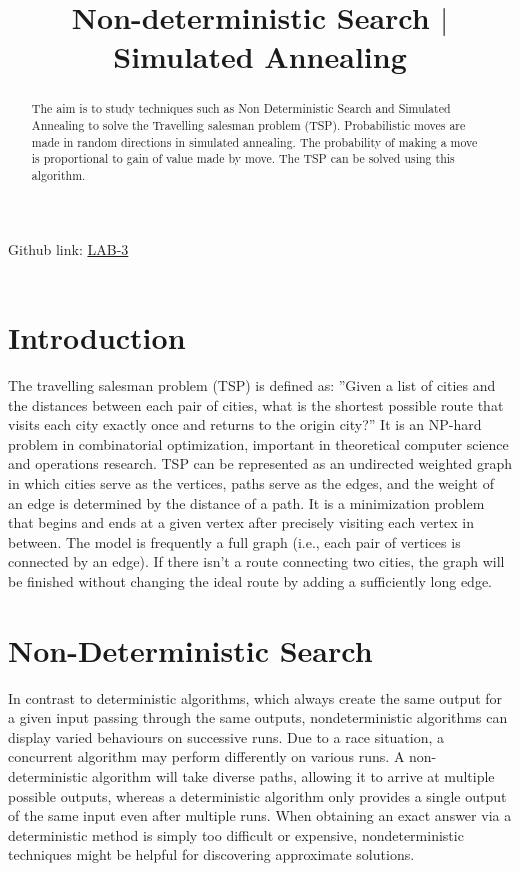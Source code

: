 \documentclass[conference]{IEEEtran}
\begin{document}
\title{Non-deterministic Search $|$ Simulated Annealing}
\author{
\and
{}
\and
{}
\and
{}
}
\maketitle
\setlength{\parindent}{20pt}
\noindent Github link: \href{https://github.com/JARVIS-codebase/LAB-3}{LAB-3} \\ \\
\indent \begin{abstract}
The aim is to study techniques such as Non Deterministic Search and Simulated Annealing to solve the Travelling salesman problem (TSP). Probabilistic moves are made in random directions in simulated annealing. The probability of making a move is proportional to gain of value made by move. The TSP can be solved using this algorithm.
\end{abstract}

\IEEEpeerreviewmaketitle

\section{Introduction}
The travelling salesman problem (TSP) is defined as: ”Given a list of cities and the distances between each pair of cities, what is the shortest possible route that visits each city exactly once and returns to the origin city?” It is an NP-hard problem in combinatorial optimization, important in theoretical computer science and operations research. TSP can be represented as an undirected weighted graph in which cities serve as the vertices, paths serve as the edges, and the weight of an edge is determined by the distance of a path. It is a minimization problem that begins and ends at a given vertex after precisely visiting each vertex in between. The model is frequently a full graph (i.e., each pair of vertices is connected by an edge). If there isn't a route connecting two cities, the graph will be finished without changing the ideal route by adding a sufficiently long edge.

\section{Non-Deterministic Search}
In contrast to deterministic algorithms, which always create the same output for a given input passing through the same outputs, nondeterministic algorithms can display varied behaviours on successive runs. Due to a race situation, a concurrent algorithm may perform differently on various runs.
A non-deterministic algorithm will take diverse paths, allowing it to arrive at multiple possible outputs, whereas a deterministic algorithm only provides a single output of the same input even after multiple runs. When obtaining an exact answer via a deterministic method is simply too difficult or expensive, nondeterministic techniques might be helpful for discovering approximate solutions.
\end{document}
